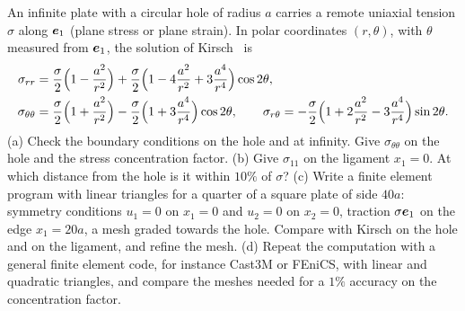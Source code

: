\label{exo:kirsch}
%
An infinite plate with a circular hole of radius $a$ carries a remote uniaxial
tension $\sigma$ along $\bm{e}_1$ (plane stress or plane strain). In polar
coordinates $(r,\theta)$, with $\theta$ measured from $\bm{e}_1$, the solution of
Kirsch~\cite{Kirsch1898} is
\begin{align*}
  \sigma_{rr}&=\frac\sigma2\Bigl(1-\frac{a^2}{r^2}\Bigr)
  +\frac\sigma2\Bigl(1-4\frac{a^2}{r^2}+3\frac{a^4}{r^4}\Bigr)\cos2\theta,\\
  \sigma_{\theta\theta}&=\frac\sigma2\Bigl(1+\frac{a^2}{r^2}\Bigr)
  -\frac\sigma2\Bigl(1+3\frac{a^4}{r^4}\Bigr)\cos2\theta,\qquad
  \sigma_{r\theta}=-\frac\sigma2\Bigl(1+2\frac{a^2}{r^2}-3\frac{a^4}{r^4}\Bigr)\sin2\theta .
\end{align*}
(a) Check the boundary conditions on the hole and at infinity. Give
$\sigma_{\theta\theta}$ on the hole and the stress concentration factor.
(b) Give $\sigma_{11}$ on the ligament $x_1=0$. At which distance from the hole
is it within $10\%$ of $\sigma$?
(c) Write a finite element program with linear triangles for a quarter of a
square plate of side $40a$: symmetry conditions $u_1=0$ on $x_1=0$ and $u_2=0$
on $x_2=0$, traction $\sigma\bm{e}_1$ on the edge $x_1=20a$, a mesh graded
towards the hole. Compare with Kirsch on the hole and on the ligament, and
refine the mesh.
(d) Repeat the computation with a general finite element code, for instance
Cast3M or FEniCS, with linear and quadratic triangles, and compare the
meshes needed for a $1\%$ accuracy on the concentration factor.

